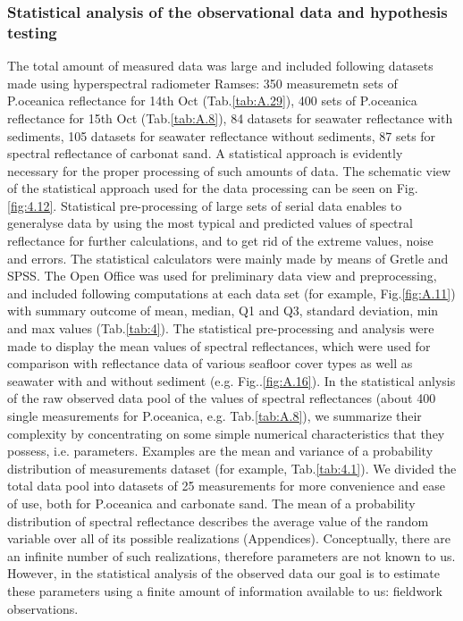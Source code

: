 \documentclass[10pt, a4paper]{article}
\begin{document}
\subsubsection{Statistical analysis of the observational data and hypothesis testing}
The total amount of measured data was large and included following datasets made using
hyperspectral radiometer Ramses: 350 measuremetn sets of P.oceanica reflectance for 14th Oct (Tab.\ref{tab:A.29}), 400
sets of P.oceanica reflectance for 15th Oct (Tab.\ref{tab:A.8}), 84 datasets for seawater reflectance with sediments, 105
datasets for seawater reflectance without sediments, 87 sets for spectral reflectance of carbonat sand.
A statistical approach is evidently necessary for the proper processing of such amounts of data. 
The schematic view of the statistical approach used for the data processing  can be seen on Fig. \ref{fig:4.12}.
Statistical pre-processing of large sets of serial data enables to generalyse data by using the most typical and predicted values of
spectral reflectance for further calculations, and to get rid of the extreme values, noise and errors.
The statistical calculators were mainly made by means of Gretle and SPSS. 
The Open Office was used for preliminary data view and preprocessing, and included following computations
at each data set (for example, Fig.\ref{fig:A.11}) with summary outcome of mean, median, Q1 and Q3, standard deviation, min and max values (Tab.\ref{tab:4}). 
The statistical pre-processing and analysis were made to display the mean values of spectral reflectances,
which were used for comparison with reflectance data of various seafloor cover types as well as
seawater with and without sediment (e.g. Fig..\ref{fig:A.16}).
In the statistical anlysis of the raw observed data pool of the values of spectral reflectances (about 400 single measurements for P.oceanica, e.g. Tab.\ref{tab:A.8}), we summarize their complexity by concentrating on some simple numerical characteristics that they possess, i.e. parameters. Examples are the mean and variance of a probability distribution of measurements dataset (for example, Tab.\ref{tab:4.1}). We divided the total data pool into datasets of 25 measurements for more convenience and ease of use, both for P.oceanica and carbonate sand. The mean of a probability distribution of spectral reflectance describes the average value of the random variable over all of its possible realizations (Appendices).  Conceptually, there are an infinite number of such realizations, therefore parameters are not known to us. However, in the statistical analysis of the observed data our goal is to estimate these parameters using a finite amount of information available to us: fieldwork observations. \\
\end{document}
